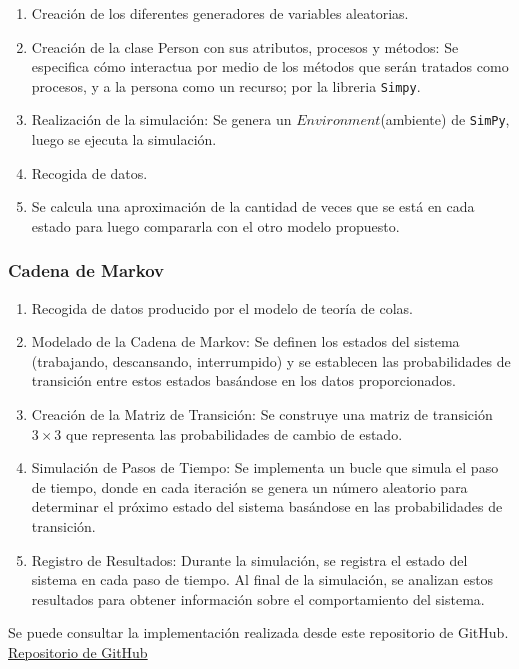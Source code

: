 \documentclass[10pt,a4paper,twocolumn]{article}
\begin{document}
\begin{enumerate}
    \item Creación de los diferentes generadores de variables aleatorias.
    \item Creaci\'on de la clase Person con sus atributos, procesos y m\'etodos: Se especifica c\'omo interactua por medio de los m\'etodos que ser\'an tratados como procesos, y a la persona como un recurso; por la libreria \texttt{Simpy}.
    \item Realizaci\'on de la simulaci\'on: Se genera un $Environment$(ambiente) de \texttt{SimPy}, luego se ejecuta la simulaci\'on.
    \item Recogida de datos.
    \item Se calcula  una aproximaci\'on de la cantidad de veces que se est\'a en cada estado para luego compararla con el otro modelo propuesto. 
\end{enumerate}

\subsubsection{Cadena de Markov}

\begin{enumerate}
    \item Recogida de datos producido por el modelo de teor\'ia de colas.
    \item Modelado de la Cadena de Markov: Se definen los estados del sistema (trabajando, descansando, interrumpido) y se establecen las probabilidades de transición entre estos estados basándose en los datos proporcionados.
    \item Creación de la Matriz de Transición: Se construye una matriz de transición $3 \times 3$ que representa las probabilidades de cambio de estado.
    \item Simulación de Pasos de Tiempo: Se implementa un bucle que simula el paso de tiempo, donde en cada iteración se genera un número aleatorio para determinar el próximo estado del sistema basándose en las probabilidades de transición.
    \item Registro de Resultados: Durante la simulación, se registra el estado del sistema en cada paso de tiempo. Al final de la simulación, se analizan estos resultados para obtener informaci\'on sobre el comportamiento del sistema.
\end{enumerate}


Se puede consultar la implementación realizada desde este repositorio de GitHub.
\href{https://github.com/roo1202/Discrete-Event-Simulation-person-working}{Repositorio de GitHub}
\end{document}
